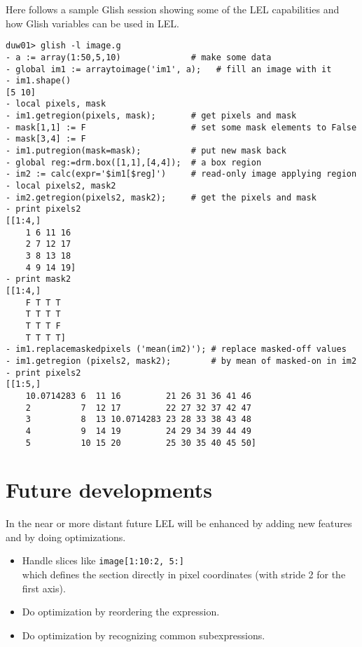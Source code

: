 Here follows a sample Glish session showing some of the LEL
capabilities and how Glish variables can be used in LEL.
\begin{verbatim}
duw01> glish -l image.g
- a := array(1:50,5,10)              # make some data
- global im1 := arraytoimage('im1', a);   # fill an image with it
- im1.shape()
[5 10]
- local pixels, mask
- im1.getregion(pixels, mask);       # get pixels and mask
- mask[1,1] := F                     # set some mask elements to False
- mask[3,4] := F
- im1.putregion(mask=mask);          # put new mask back
- global reg:=drm.box([1,1],[4,4]);  # a box region
- im2 := calc(expr='$im1[$reg]')     # read-only image applying region
- local pixels2, mask2
- im2.getregion(pixels2, mask2);     # get the pixels and mask
- print pixels2
[[1:4,]
    1 6 11 16
    2 7 12 17
    3 8 13 18
    4 9 14 19] 
- print mask2
[[1:4,]
    F T T T
    T T T T
    T T T F
    T T T T] 
- im1.replacemaskedpixels ('mean(im2)'); # replace masked-off values
- im1.getregion (pixels2, mask2);        # by mean of masked-on in im2
- print pixels2
[[1:5,]
    10.0714283 6  11 16         21 26 31 36 41 46
    2          7  12 17         22 27 32 37 42 47
    3          8  13 10.0714283 23 28 33 38 43 48
    4          9  14 19         24 29 34 39 44 49
    5          10 15 20         25 30 35 40 45 50]
\end{verbatim}

\section{Future developments}
In the near or more distant future LEL will be enhanced by adding new
features and by doing optimizations.
\begin{itemize}
  \item Handle slices like \texttt{image[1:10:2, 5:]}
        \\which defines the section directly in pixel coordinates (with
        stride 2 for the first axis).
  \item Do optimization by reordering the expression.
  \item Do optimization by recognizing common subexpressions.
\end{itemize}
